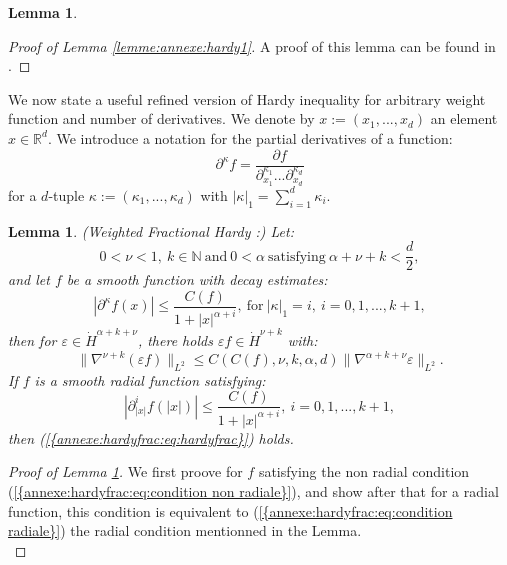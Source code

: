 \documentclass[11pt,a4paper,reqno]{amsart}
\newtheorem{lemma}[theorem]{Lemma}
\theoremstyle{remark}
\numberwithin{equation}{section}
\begin{document}
\begin{appendix}
\begin{lemma}
\end{lemma}

\begin{proof}[Proof of Lemma \ref{lemme:annexe:hardy1}]
A proof of this lemma can be found in \cite{MRRod2}.
\end{proof}

We now state a useful refined version of Hardy inequality for arbitrary weight function and number of derivatives. We denote by $x:=(x_1,...,x_d)$ an element $x\in \mathbb{R}^d$. We introduce a notation for the partial derivatives of a function:
\begin{equation} \label{annexe:hardyfrac:notations derivees}
\partial^{\kappa} f=\frac{\partial f}{\partial_{x_1}^{\kappa_1}...\partial_{x_d}^{\kappa_d} }
\end{equation}
for a $d$-tuple $\kappa:=(\kappa_1,...,\kappa_d)$ with $|\kappa|_1=\sum_{i=1}^d \kappa_i$.
\begin{lemma}\label{annexe:lem: hardy frac a poids}
\emph{(Weighted Fractional Hardy :)} Let:
$$
0<\nu<1, \ k\in \mathbb{N} \ \text{and} \ 0<\alpha \ \text{satisfying} \ \alpha+\nu+k <\frac{d}{2} ,
$$
and let $f$ be a smooth function with decay estimates:
\begin{equation} \label{annexe:hardyfrac:eq:condition non radiale}
|\partial^{\kappa} f(x)|\leq \frac{C(f)}{1+|x|^{\alpha+i}}, \ \text{for} \ |\kappa|_1=i, \ i=0,1,...,k+1 , 
\end{equation}
then for $\varepsilon\in \dot{H}^{\alpha+k+\nu}$, there holds $\varepsilon f\in \dot{H}^{\nu+k} $ with:
\begin{equation} \label{annexe:hardyfrac:eq:hardyfrac}
\parallel \nabla^{\nu+k} (\varepsilon f)\parallel_{L^2} \leq C(C(f),\nu,k,\alpha,d) \parallel \nabla^{\alpha+k+\nu}\varepsilon \parallel_{L^2} .
\end{equation}
If $f$ is a smooth radial function satisfying:
\begin{equation} \label{annexe:hardyfrac:eq:condition radiale}
|\partial_{|x|}^i f(|x|)|\leq \frac{C(f)}{1+|x|^{\alpha+i}}, \ i=0,1,...,k+1,
\end{equation}
then {{\rm (\ref{{annexe:hardyfrac:eq:hardyfrac}})}} holds.
\end{lemma}

\begin{proof}[Proof of Lemma \ref{annexe:lem: hardy frac a poids}]
We first proove for $f$ satisfying the non radial condition {{\rm (\ref{{annexe:hardyfrac:eq:condition non radiale}})}}, and show after that for a radial function, this condition is equivalent to {{\rm (\ref{{annexe:hardyfrac:eq:condition radiale}})}} the radial condition mentionned in the Lemma.\\


\end{proof}
\end{appendix}
\end{document}
